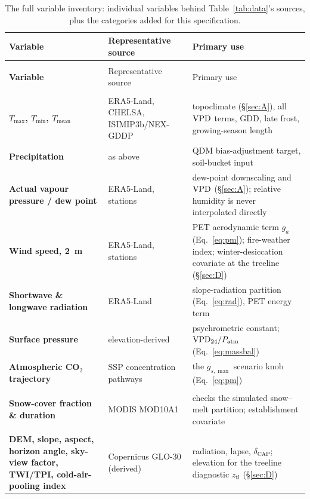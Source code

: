 \begin{xltabular}{\linewidth}{@{}>{\raggedright\arraybackslash\bfseries\sffamily}p{3.4cm}>{\raggedright\arraybackslash}p{4.3cm}>{\raggedright\arraybackslash}X@{}}
\caption{The full variable inventory: individual variables behind Table~\ref{tab:data}'s sources, plus the categories added for this specification.}\label{tab:vars}\\
\toprule
Variable & Representative source & Primary use\\
\midrule
\endfirsthead
{}\\
\toprule
Variable & Representative source & Primary use\\
\midrule
\endhead
\bottomrule
\endfoot
{}\\
$T_{\max}$, $T_{\min}$, $T_{\text{mean}}$ & ERA5-Land, CHELSA, ISIMIP3b/NEX-GDDP & topoclimate (\S\ref{sec:A}), all $\mathrm{VPD}$ terms, GDD, late frost, growing-season length\\
Precipitation & as above & QDM bias-adjustment target, soil-bucket input\\
Actual vapour pressure / dew point & ERA5-Land, stations & dew-point downscaling and $\mathrm{VPD}$ (\S\ref{sec:A}); relative humidity is never interpolated directly\\
Wind speed, 2~m & ERA5-Land, stations & PET aerodynamic term $g_a$ (Eq.~\eqref{eq:pm}); fire-weather index; winter-desiccation covariate at the treeline (\S\ref{sec:D})\\
Shortwave \& longwave radiation & ERA5-Land & slope-radiation partition (Eq.~\eqref{eq:rad}), PET energy term\\
Surface pressure & elevation-derived & psychrometric constant; $\mathrm{VPD}_{24}/P_{\text{atm}}$ (Eq.~\eqref{eq:massbal})\\
Atmospheric CO$_2$ trajectory & SSP concentration pathways & the $g_{s,\max}$ scenario knob (Eq.~\eqref{eq:pm})\\
\\
Snow-cover fraction \& duration & MODIS MOD10A1 & checks the simulated snow--melt partition; establishment covariate\\
\\
DEM, slope, aspect, horizon angle, sky-view factor, TWI/TPI, cold-air-pooling index & Copernicus GLO-30 (derived) & radiation, lapse, $\delta_{\text{CAP}}$; elevation for the treeline diagnostic $z_{\text{tl}}$ (\S\ref{sec:D})\\

\end{xltabular}
